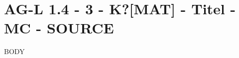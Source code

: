 \section{AG-L 1.4 - 3 - K?[MAT] - Titel - MC - SOURCE}

\begin{beispiel}[AG-L 1.4]{1}
BODY
\end{beispiel}